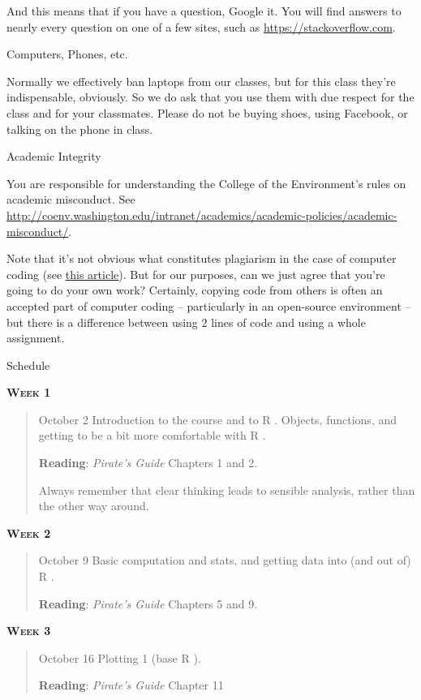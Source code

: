\documentclass[11pt,letterpaper]{article}
\newcommand{\R}[0]{\textsf{R }}
\begin{document}
And this means that if you have a question, Google it.  You will find answers to nearly every question on one of a few sites, such as \url{https://stackoverflow.com}.

{\Large Computers, Phones, etc.}\hrulefill

Normally we effectively ban laptops from our classes, but for this class they're indispensable, obviously. So we do ask that you use them with due respect for the class and for your classmates. Please do not be buying shoes, using Facebook, or talking on the phone in class.

{\Large Academic Integrity}\hrulefill

You are responsible for understanding the College of the Environment's
rules on academic misconduct. See
\url{http://coenv.washington.edu/intranet/academics/academic-policies/academic-misconduct/}.

Note that it's not obvious what constitutes plagiarism in the case of computer coding (see \href{https://www.nytimes.com/2017/05/29/us/computer-science-cheating.html}{\underline{this article}}). But for our purposes, can we just agree that you're going to do your own work? Certainly, copying code from others is often an accepted part of computer coding -- particularly in an open-source environment -- but there is a difference between using 2 lines of code and using a whole assignment.
\pagebreak

\huge Schedule
\hrulefill

\normalsize


\textbf{\textsc{Week 1}}
\begin{quote}	
October 2  \textbullet \space Introduction to the course and to \R. Objects, functions, and getting to be a bit more comfortable with \R.

\textbf{Reading}: \textit{Pirate's Guide} Chapters 1 and 2. 

Always remember that clear thinking leads to sensible analysis, rather than the other way around.
\end{quote}

\textbf{\textsc{Week 2}}
\begin{quote}	
October 9  \textbullet \space Basic computation and stats, and getting data into (and out of) \R. 

\textbf{Reading}: \textit{Pirate's Guide} Chapters 5 and 9.

\end{quote}

\textbf{\textsc{Week 3}}
\begin{quote}	
October 16  \textbullet \space Plotting 1 (base \R). 

\textbf{Reading}: \textit{Pirate's Guide} Chapter 11

\end{quote}
\end{document}
